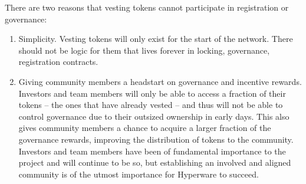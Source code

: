\documentclass{article}
\begin{document}
There are two reasons that vesting tokens cannot participate in registration or governance:
\begin{enumerate}
    \item Simplicity.
         Vesting tokens will only exist for the start of the network.
         There should not be logic for them that lives forever in locking, governance, registration contracts.
    \item Giving community members a headstart on governance and incentive rewards.
         Investors and team members will only be able to access a fraction of their tokens -- the ones that have already vested -- and thus will not be able to control governance due to their outsized ownership in early days.
         This also gives community members a chance to acquire a larger fraction of the governance rewards, improving the distribution of tokens to the community.
         Investors and team members have been of fundamental importance to the project and will continue to be so, but establishing an involved and aligned community is of the utmost importance for Hyperware to succeed.
\end{enumerate}
\end{document}
